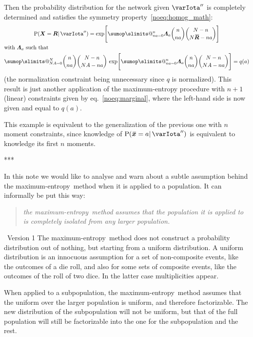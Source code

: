 \documentclass{article}
\makeatletter
\theoremstyle{remark}
\theoremstyle{innote}
\def\sum{\DOTSI\sumop\slimits@}
\renewcommand*{\|}{\mathpunct{|}}%
\newcommand*{\p}{\mathrm{P}}%
\newcommand*{\eqn}{eq.}%
\theoremstyle{simple}
\newcommand*{\puzzle}{{\fontencoding{U}\fontfamily{fontawesometwo}\selectfont\symbol{225}}}
\newcommand{\mynote}[1]{ {\color{notecolour}\puzzle\ #1}}
\newcommand*{\widebar}[1]{{\mkern1.5mu\skew{2}\overline{\mkern-1.5mu#1\mkern-1.5mu}\mkern 1.5mu}}
\newcommand*{\av}{\widebar} %
\newcommand*{\sav}{\widebar} %
\newcommand*{\yxx}{x}%
\newcommand*{\yx}{\bm{\yxx}}%
\newcommand*{\yxs}{\sav{\yx}}%
\newcommand*{\yX}{\bm{X}}%
\newcommand*{\yXf}{\av{\yX}}%
\newcommand*{\yR}{\bm{R}}%
\newcommand*{\yRf}{\av{\yR}}%
\newcommand*{\yHb}{\varIota''}
\newcommand*{\yL}{\bm{\varLambda}}
\newcommand*{\me}{maximum-entropy}
\makeatother
\begin{document}
\medskip Then the probability distribution for the network given $\yHb$ is
completely determined and satisfies the symmetry
property~\eqref{noeq:homog_math}:
\begin{multline}
  \label{noeq:pop_distr_maxent2}
  \p(\yX= \yR \|\yHb) =
\exp\Biggl[
\sum_{n a=0}^n \yL_{ a}
\binom{n}{n a}
\binom{N-n}{N\yRf-n a}\Biggr]
\\
\!\begin{aligned}[b]
&\text{with $\yL_{ a}$ such that}
\\
&\sum_{N A=0}^N 
\binom{n}{n a}
\binom{N-n}{N A-n a}\,
\exp\Biggl[
\sum_{n a=0}^n \yL_{ a}
\binom{n}{n a}
\binom{N-n}{N A-n a}\Biggr]
=q( a)
\end{aligned}
\end{multline}
(the normalization constraint being unnecessary since $q$ is normalized).
This result is just another application of the maximum-entropy procedure
with $n+1$ (linear) constraints given by \eqn~\eqref{noeq:marginal}, where
the left-hand side is now given and equal to $q(a)$.

This example is equivalent to the generalization of the previous one with
$n$ moment constraints, since knowledge of $\p(\yxs=a \| \yHb)$ is
equivalent to knowledge its first $n$ moments.

***



In this note we would like to analyse and warn about a subtle assumption
behind the \me\ method when it is applied to a population. It can informally
be put this way:
\begin{quote}
  \emph{the \me\ method assumes that the population it is applied to is
    completely isolated from any larger population.}
\end{quote}

\mynote{Version 1}
The \me\ method does not construct a probability distribution out of
nothing, but starting from a uniform distribution. A uniform distribution
is an innocuous assumption for a set of non-composite events, like the
outcomes of a die roll, and also for some sets of composite events, like
the outcomes of the roll of two dice. In the latter case multiplicities
appear.

When applied to a subpopulation, the \me\ method assumes that the uniform over
the larger population is uniform, and therefore factorizable. The new
distribution of the subpopulation will not be uniform, but that of the full
population will still be factorizable into the one for the subpopulation and the
rest.
\end{document}
